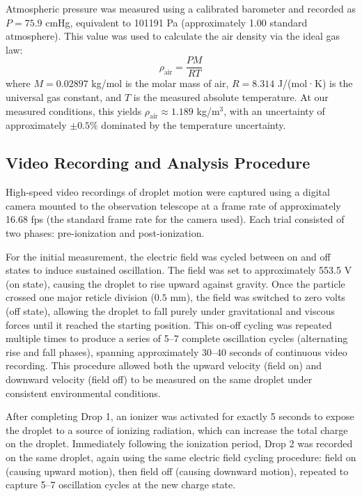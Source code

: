 \documentclass[11pt]{article}
\begin{document}
Atmospheric pressure was measured using a calibrated barometer and recorded as $P = 75.9$ cmHg, equivalent to 101191 Pa (approximately 1.00 standard atmosphere). This value was used to calculate the air density via the ideal gas law:
\begin{equation}
\rho_{\text{air}} = \frac{PM}{RT}
\end{equation}
where $M = 0.02897$ kg/mol is the molar mass of air, $R = 8.314$ J/(mol·K) is the universal gas constant, and $T$ is the measured absolute temperature. At our measured conditions, this yields $\rho_{\text{air}} \approx 1.189$ kg/m$^3$, with an uncertainty of approximately $\pm 0.5\%$ dominated by the temperature uncertainty.

\subsection{Video Recording and Analysis Procedure}

High-speed video recordings of droplet motion were captured using a digital camera mounted to the observation telescope at a frame rate of approximately 16.68 fps (the standard frame rate for the camera used). Each trial consisted of two phases: pre-ionization and post-ionization.

For the initial measurement, the electric field was cycled between on and off states to induce sustained oscillation. The field was set to approximately 553.5 V (on state), causing the droplet to rise upward against gravity. Once the particle crossed one major reticle division ($0.5$ mm), the field was switched to zero volts (off state), allowing the droplet to fall purely under gravitational and viscous forces until it reached the starting position. This on-off cycling was repeated multiple times to produce a series of 5--7 complete oscillation cycles (alternating rise and fall phases), spanning approximately 30--40 seconds of continuous video recording. This procedure allowed both the upward velocity (field on) and downward velocity (field off) to be measured on the same droplet under consistent environmental conditions.

After completing Drop 1, an ionizer was activated for exactly 5 seconds to expose the droplet to a source of ionizing radiation, which can increase the total charge on the droplet. Immediately following the ionization period, Drop 2 was recorded on the same droplet, again using the same electric field cycling procedure: field on (causing upward motion), then field off (causing downward motion), repeated to capture 5--7 oscillation cycles at the new charge state.
\end{document}
